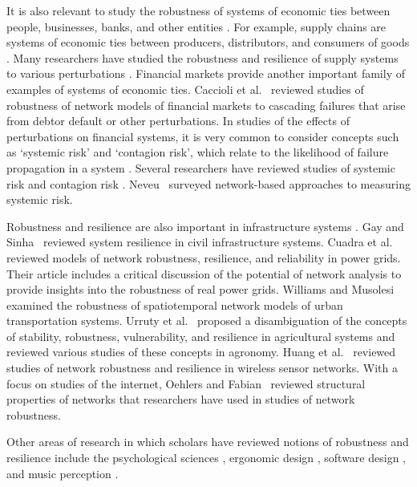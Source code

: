 \documentclass{comnet-mod}
\begin{document}
It is also relevant to study the robustness of systems of economic ties between people, businesses, banks, and other entities \cite{Bhamra2011, Tukamuhabwa2015, Hosseini2016, Kamalahmadi2016, Caccioli2018, Monostori2018}. For example, supply chains are systems of economic ties between producers, distributors, and consumers of goods \cite{Tang2016}. Many researchers have studied the robustness and resilience of supply systems to various perturbations \cite{Bhamra2011, Tukamuhabwa2015, Hosseini2016, Kamalahmadi2016, Monostori2018}. Financial markets provide another important family of examples of systems of economic ties. Caccioli et al.~\cite{Caccioli2018} reviewed studies of robustness of network models of financial markets to cascading failures that arise from debtor default or other perturbations. In studies of the effects of perturbations on financial systems, it is very common to consider concepts such as `systemic risk' and `contagion risk', which relate to the likelihood of failure propagation in a system \cite{Helbing2013}. Several researchers have reviewed studies of systemic risk \cite{deBandt2000, Eisenberg2001, Haldane2011, Bisias2012, Altar2015, Benoit2017} and contagion risk \cite{Hasman2013, Pei2017}. Neveu~ \cite{Neveu2018} surveyed network-based approaches to measuring systemic risk.

Robustness and resilience are also important in infrastructure systems \cite{Gay2013, Cuadra2015, Huang2015, Urruty2016, Williams2016}. Gay and Sinha~\cite{Gay2013} reviewed system resilience in civil infrastructure systems. Cuadra et al.~\cite{Cuadra2015} reviewed models of network robustness, resilience, and reliability in power grids. Their article includes a critical discussion of the potential of network analysis to provide insights into the robustness of real power grids. Williams and Musolesi~\cite{Williams2016} examined the robustness of spatiotemporal network models of urban transportation systems. Urruty et al.~\cite{Urruty2016} proposed a disambiguation of the concepts of stability, robustness, vulnerability, and resilience in  agricultural systems and reviewed various studies of these concepts in agronomy. Huang et al.~\cite{Huang2015}
reviewed studies of network robustness and resilience in wireless sensor networks. With a focus on studies of the internet, Oehlers and Fabian~\cite{Oehlers2021} reviewed structural properties of networks that researchers have used in studies of network robustness.

Other areas of research in which scholars have reviewed notions of robustness and resilience include the psychological sciences \cite{Walsh2013}, ergonomic design \cite{Hoffman2017}, software design \cite{Shahrokni2013}, and music perception \cite{Keller2018}.
\end{document}
